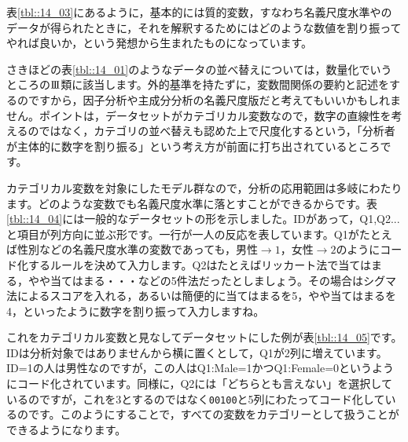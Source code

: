 \documentclass{ltjsbook}
\begin{document}
表\ref{tbl::14_03}にあるように，基本的には質的変数，すなわち名義尺度水準やのデータが得られたときに，それを解釈するためにはどのような数値を割り振ってやれば良いか，という発想から生まれたものになっています。

さきほどの表\ref{tbl::14_01}のようなデータの並べ替えについては，数量化でいうところの$\mathrm{I}\hspace{-1.2pt}\mathrm{I}\hspace{-1.2pt}\mathrm{I}$類に該当します。外的基準を持たずに，変数間関係の要約と記述をするのですから，因子分析や主成分分析の名義尺度版だと考えてもいいかもしれません。ポイントは，データセットがカテゴリカル変数なので，数字の直線性を考えるのではなく，カテゴリの並べ替えも認めた上で尺度化するという，「分析者が主体的に数字を割り振る」という考え方が前面に打ち出されているところです。

カテゴリカル変数を対象にしたモデル群なので，分析の応用範囲は多岐にわたります。どのような変数でも名義尺度水準に落とすことができるからです。表\ref{tbl::14_04}には一般的なデータセットの形を示しました。IDがあって，Q1,Q2...と項目が列方向に並ぶ形です。一行が一人の反応を表しています。Q1がたとえば性別などの名義尺度水準の変数であっても，男性$\to1$，女性$\to2$のようにコード化するルールを決めて入力します。Q2はたとえばリッカート法で当てはまる，やや当てはまる・・・などの5件法だったとしましょう。その場合はシグマ法によるスコアを入れる，あるいは簡便的に当てはまるを5，やや当てはまるを4，といったように数字を割り振って入力しますね。

これをカテゴリカル変数と見なしてデータセットにした例が表\ref{tbl::14_05}です。IDは分析対象ではありませんから横に置くとして，Q1が2列に増えています。ID=1の人は男性なのですが，この人はQ1:Male=1かつQ1:Female=0というようにコード化されています。同様に，Q2には「どちらとも言えない」を選択しているのですが，これを3とするのではなく\texttt{00100}と5列にわたってコード化しているのです。このようにすることで，すべての変数をカテゴリーとして扱うことができるようになります。
\end{document}
